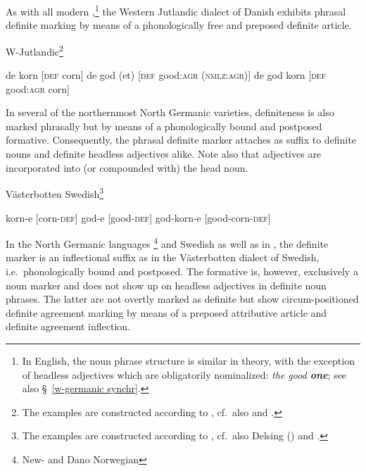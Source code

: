{As with all modern ,\footnote{In English, the noun phrase structure is similar in theory, with the exception of headless adjectives which are obligatorily nominalized: \textit{the good \textbf{one}}; see also \S~\ref{w-germanic synchr}.} the Western Jutlandic dialect of Danish exhibits phrasal definite marking by means of a phonologically free and preposed definite article.
\begin{exe}
\ex \rm{W-Jutlandic}\footnote{The examples are constructed according to \citet{lund1932}, cf.~also \citet[121–122]{delsing1993} and \citet{dahl2003}.}
\begin{xlist}
\ex de korn \rm{[\textsc{def} corn]}
\ex de god (et) \rm{[\textsc{def} good:\textsc{agr} (\textsc{nmlz:agr})]}
\ex de god korn \rm{[\textsc{def} good:\textsc{agr} corn]}
\end{xlist}
\end{exe}
In several of the northernmost North Germanic varieties, definiteness is also marked phrasally but by means of a phonologically bound and postposed formative. Consequently, the phrasal definite marker attaches as suffix to definite nouns and definite headless adjectives alike. Note also that adjectives are incorporated into (or compounded with) the head noun. 
\begin{exe}
\ex \rm{Västerbotten Swedish}\footnote{The examples are constructed according to \citet{astrom1893}, cf.~also Delsing (\citeyear[122–123]{delsing1993}) and \cite{dahl2003}.}
\begin{xlist}
\ex korn-e \rm{[corn-\textsc{def}]}
\ex god-e \rm{[good-\textsc{def}]}
\ex god-korn-e \rm{[good-corn-\textsc{def}]}
\end{xlist}
\end{exe}
In the North Germanic languages \footnote{New- and Dano Norwegian} and Swedish as well as in , the definite marker is an inflectional suffix as in the Västerbotten dialect of Swedish, i.e.~phonologically bound and postposed. The formative is, however, exclusively a noun marker and does not show up on headless adjectives in definite noun phrases. The latter are not overtly marked as definite but show circum-positioned definite agreement marking by means of a preposed attributive article and definite agreement inflection.
\begin{exe}

\end{exe}}
